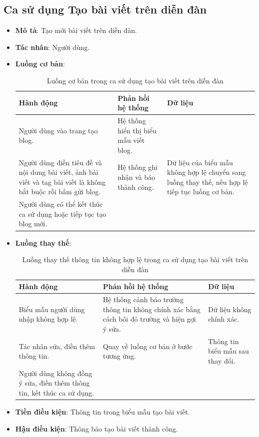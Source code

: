 \documentclass[./../main.tex]{subfiles}
\begin{document}
\subsection{Ca sử dụng Tạo bài viết trên diễn đàn}
\begin{itemize}
    \item \textbf{Mô tả}: Tạo mới bài viết trên diễn đàn.
    \item \textbf{Tác nhân}: Người dùng.
    \item \textbf{Luồng cơ bản}:
    \begin{table}[H]
    \caption{\label{uc-41}Luồng cơ bản trong ca sử dụng tạo bài viết trên diễn đàn}
    \begin{tabularx}{\textwidth}{| X | X | X |}
        \hline
        \textbf{Hành động} & \textbf{Phản hồi hệ thống} & \textbf{Dữ liệu} 
        \\ \hline
         Người dùng vào trang tạo blog. & Hệ thống hiển thị biểu mẫu viết blog. & 
        \\ \hline
        Người dùng điền tiêu đề và nội dung bài viết, ảnh bài viết và tag bài viết là không bắt buộc rồi bấm gửi blog. & Hệ thống ghi nhận và báo thành công. & Dữ liệu của biểu mẫu không hợp lệ chuyển sang luồng thay thế, nếu hợp lệ tiếp tục luồng cơ bản.
        \\ \hline
        Người dùng có thể kết thúc ca sử dụng hoặc tiếp tục tạo blog mới. & &
        \\ \hline
    \end{tabularx}
    \end{table}    
    \item \textbf{Luồng thay thế}: 
    \begin{table}[H]
    \caption{\label{uc-42}Luồng thay thế thông tin không hợp lệ trong ca sử dụng tạo bài viết trên diễn đàn}
    \begin{tabularx}{\textwidth}{| X | X | X |}
        \hline
        \textbf{Hành động} & \textbf{Phản hồi hệ thống} & \textbf{Dữ liệu} \\ \hline
        Biểu mẫu người dùng nhập không hợp lệ. & Hệ thống cảnh báo trường thông tin không chính xác bằng cách bôi đỏ trường và hiện gợi ý sửa. & Dữ liệu không chính xác.
        \\ \hline
        Tác nhân sửa, điền thêm thông tin. & Quay về luồng cơ bản ở bước tương ứng. & Thông tin biểu mẫu sau thay đổi.
        \\ \hline
        Người dùng không đồng ý sửa, điền thêm thông tin, kết thúc ca sử dụng. & & 
        \\ \hline
    \end{tabularx}
    \end{table}
    \item \textbf{Tiền điều kiện}: Thông tin trong biểu mẫu tạo bài viết.
    \item \textbf{Hậu điều kiện}: Thông báo tạo bài viết thành công.
\end{itemize}
\end{document}
